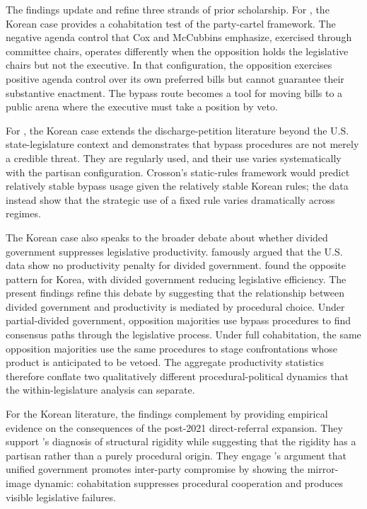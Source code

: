 \documentclass[11pt]{article}
\begin{document}
The findings update and refine three strands of prior scholarship. For \citet{coxmccubbins2005}, the Korean case provides a cohabitation test of the party-cartel framework. The negative agenda control that Cox and McCubbins emphasize, exercised through committee chairs, operates differently when the opposition holds the legislative chairs but not the executive. In that configuration, the opposition exercises positive agenda control over its own preferred bills but cannot guarantee their substantive enactment. The bypass route becomes a tool for moving bills to a public arena where the executive must take a position by veto.

For \citet{crosson2018}, the Korean case extends the discharge-petition literature beyond the U.S. state-legislature context and demonstrates that bypass procedures are not merely a credible threat. They are regularly used, and their use varies systematically with the partisan configuration. Crosson's static-rules framework would predict relatively stable bypass usage given the relatively stable Korean rules; the data instead show that the strategic use of a fixed rule varies dramatically across regimes.

The Korean case also speaks to the broader debate about whether divided government suppresses legislative productivity. \citet{mayhew1991} famously argued that the U.S. data show no productivity penalty for divided government. \citet{leehs2012} found the opposite pattern for Korea, with divided government reducing legislative efficiency. The present findings refine this debate by suggesting that the relationship between divided government and productivity is mediated by procedural choice. Under partial-divided government, opposition majorities use bypass procedures to find consensus paths through the legislative process. Under full cohabitation, the same opposition majorities use the same procedures to stage confrontations whose product is anticipated to be vetoed. The aggregate productivity statistics therefore conflate two qualitatively different procedural-political dynamics that the within-legislature analysis can separate.

For the Korean literature, the findings complement \citet{parkpy2026} by providing empirical evidence on the consequences of the post-2021 direct-referral expansion. They support \citet{kimlee2026}'s diagnosis of structural rigidity while suggesting that the rigidity has a partisan rather than a purely procedural origin. They engage \citet{parkhs2025}'s argument that unified government promotes inter-party compromise by showing the mirror-image dynamic: cohabitation suppresses procedural cooperation and produces visible legislative failures.
\end{document}

